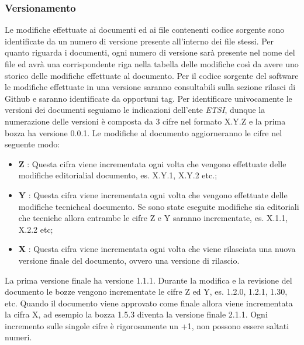 	\subsubsection{Versionamento}
		Le modifiche effettuate ai documenti ed ai file contenenti codice sorgente sono identificate da un numero di versione presente all'interno dei file stessi. Per quanto riguarda i documenti, ogni numero di versione sarà presente nel nome del file ed avrà una corrispondente riga nella tabella delle modifiche così da avere uno storico delle modifiche effettuate al documento. Per il codice sorgente del software le modifiche effettuate in una versione saranno consultabili sulla sezione rilasci di Github e saranno identificate da opportuni tag.
		\newline
		Per identificare univocamente le versioni dei documenti seguiamo le indicazioni dell'ente \textit{ETSI}, dunque la numerazione delle versioni è composta da 3 cifre nel formato X.Y.Z e la prima bozza ha versione 0.0.1. Le modifiche al documento aggiorneranno le cifre nel seguente modo:
		\begin{itemize}
			\item \textbf{Z} : Questa cifra viene incrementata ogni volta che vengono effettuate delle modifiche editoriali\glosp al documento, es. X.Y.1, X.Y.2 etc.;
			\item \textbf{Y} : Questa cifra viene incrementata ogni volta che vengono effettuate delle modifiche tecniche\glosp al documento. Se sono state eseguite modifiche sia editoriali che tecniche allora entrambe le cifre Z e Y saranno incrementate, es. X.1.1, X.2.2 etc;
			\item \textbf{X} : Questa cifra viene incrementata ogni volta che viene rilasciata una nuova versione finale del documento, ovvero una versione di rilascio.			
		\end{itemize}
		La prima versione finale ha versione 1.1.1.
		\newline
		Durante la modifica e la revisione del documento le bozze vengono incrementate le cifre Z ed Y, es. 1.2.0, 1.2.1, 1.30, etc.
		\newline
		Quando il documento viene approvato come finale allora viene incrementata la cifra X, ad esempio la bozza 1.5.3 diventa la versione finale 2.1.1.
		\newline
		Ogni incremento sulle singole cifre è rigorosamente un +1, non possono essere saltati numeri.
		
